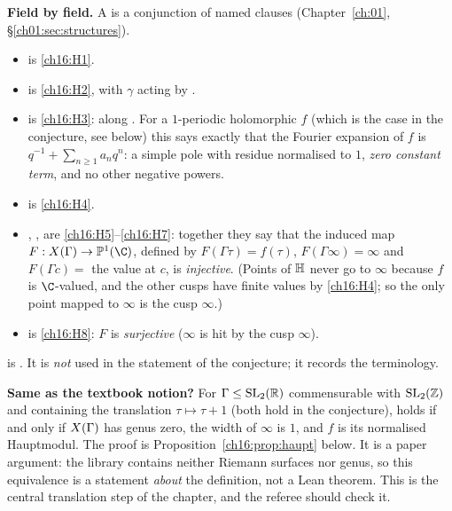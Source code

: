 \begin{dictionary}
\textbf{Field by field.}  A  is a conjunction of named clauses
(Chapter~\ref{ch:01}, \S\ref{ch01:sec:structures}).
\begin{itemize}
\item {} is \ref{ch16:H1}.
\item {} is \ref{ch16:H2}, with $\gamma$ acting by .
\item {} is \ref{ch16:H3}:  along .  For a $1$-periodic
  holomorphic $f$ (which is the case in the conjecture, see below) this says exactly that the Fourier expansion of $f$
  is $q^{-1}+\sum_{n\ge1}a_nq^n$: a simple pole with residue normalised to $1$, \emph{zero constant term}, and no other
  negative powers.
\item {} is \ref{ch16:H4}.
\item {}, ,  are \ref{ch16:H5}--\ref{ch16:H7}:
  together they say that the induced map $F:\chsixteenX\to\chsixteenP(\C)$, defined by $F(\Gamma\tau)=f(\tau)$,
  $F(\Gamma\infty)=\infty$ and $F(\Gamma c)=$ the value at $c$, is \emph{injective}.  (Points of $\mathbb{H}$ never go
  to $\infty$ because $f$ is $\C$-valued, and the other cusps have finite values by \ref{ch16:H4}; so the only point
  mapped to $\infty$ is the cusp $\infty$.)
\item {} is \ref{ch16:H8}: $F$ is \emph{surjective} ($\infty$ is hit by the cusp $\infty$).
\end{itemize}
 is .  It is \emph{not} used in the statement of the
conjecture; it records the terminology.

\textbf{Same as the textbook notion?}  For $\Gamma\le\mathrm{SL}_2(\mathbb{R})$ commensurable with $\mathrm{SL}_2(\mathbb{Z})$ and containing
the translation $\tau\mapsto\tau+1$ (both hold in the conjecture),  holds if and only
if $X(\Gamma)$ has genus zero, the width of $\infty$ is $1$, and $f$ is its normalised Hauptmodul.  The proof is
Proposition~\ref{ch16:prop:haupt} below.  It is a paper argument: the library contains neither Riemann surfaces nor
genus, so this equivalence is a statement \emph{about} the definition, not a Lean theorem.  This is the central
translation step of the chapter, and the referee should check it.


\end{dictionary}
